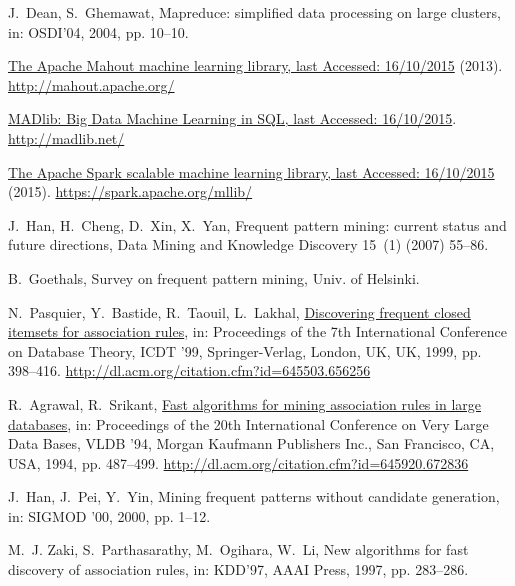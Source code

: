 \documentclass[preprint,review,12pt]{elsarticle}
\begin{document}
\begin{thebibliography}{10}
J.~Dean, S.~Ghemawat, Mapreduce: simplified data processing on large clusters,
  in: OSDI'04, 2004, pp. 10--10.

\href{http://mahout.apache.org/}{{The Apache Mahout machine learning library,
  last Accessed: 16/10/2015}} (2013).
\newline\urlprefix\url{http://mahout.apache.org/}

\href{http://madlib.net/}{{MADlib: Big Data Machine Learning in SQL, last
  Accessed: 16/10/2015}}.
\newline\urlprefix\url{http://madlib.net/}

\href{https://spark.apache.org/mllib/}{{The Apache Spark scalable machine
  learning library, last Accessed: 16/10/2015}} (2015).
\newline\urlprefix\url{https://spark.apache.org/mllib/}

J.~Han, H.~Cheng, D.~Xin, X.~Yan, Frequent pattern mining: current status and
  future directions, Data Mining and Knowledge Discovery 15~(1) (2007) 55--86.

B.~Goethals, Survey on frequent pattern mining, Univ. of Helsinki.

N.~Pasquier, Y.~Bastide, R.~Taouil, L.~Lakhal,
  \href{http://dl.acm.org/citation.cfm?id=645503.656256}{Discovering frequent
  closed itemsets for association rules}, in: Proceedings of the 7th
  International Conference on Database Theory, ICDT '99, Springer-Verlag,
  London, UK, UK, 1999, pp. 398--416.
\newline\urlprefix\url{http://dl.acm.org/citation.cfm?id=645503.656256}

R.~Agrawal, R.~Srikant,
  \href{http://dl.acm.org/citation.cfm?id=645920.672836}{Fast algorithms for
  mining association rules in large databases}, in: Proceedings of the 20th
  International Conference on Very Large Data Bases, VLDB '94, Morgan Kaufmann
  Publishers Inc., San Francisco, CA, USA, 1994, pp. 487--499.
\newline\urlprefix\url{http://dl.acm.org/citation.cfm?id=645920.672836}

J.~Han, J.~Pei, Y.~Yin, Mining frequent patterns without candidate generation,
  in: SIGMOD '00, 2000, pp. 1--12.

M.~J. Zaki, S.~Parthasarathy, M.~Ogihara, W.~Li, New algorithms for fast
  discovery of association rules, in: KDD'97, AAAI Press, 1997, pp. 283--286.


\end{thebibliography}
\end{document}
